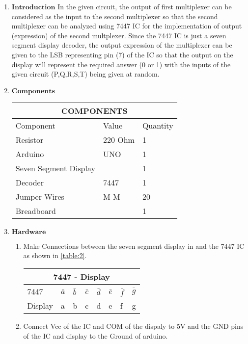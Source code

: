 \documentclass{article}
\begin{document}
\begin{enumerate}
	\item $\textbf{Introduction}$ \newline
		In the given circuit, the output of first multiplexer can be considered as the input to the second multiplexer so that the second multiplexer can be analyzed using 7447 IC for the implementation of output (expression) of the second multplexer. Since the 7447 IC is just a seven segment display decoder, the output expression of the multiplexer can be given to the LSB representing pin (7) of the IC so that the output on the display will represent the required answer (0 or 1) with the inputs of the given circuit (P,Q,R,S,T) being given at random.
	\item $\textbf{Components}$
		\label{table:1}\begin{tabular}{|p{5cm}|p{3cm}|p{2cm}|}
			\hline
			\multicolumn{3}{|c|}{COMPONENTS}\\
			\hline
			Component& Value& Quantity\\
			\hline
			Resistor &220 Ohm& 1\\
			\hline
			Arduino& UNO& 1\\
			\hline
			Seven Segment Display&  & 1\\
			\hline
			Decoder& 7447& 1\\
			\hline
			Jumper Wires& M-M& 20\\
			\hline
			Breadboard&  & 1\\
			\hline
		\end{tabular}
		\item $\textbf{Hardware}$
		\begin{enumerate}
			\item Make Connections between the seven segment display in and the 7447 IC as shown in \ref{table:2}.
				\label{table:2}\begin{tabular}{|p{3cm}|p{1cm}|p{1cm}|p{1cm}|p{1cm}|p{1cm}|p{1cm}|p{1cm}|}
					\hline
					\multicolumn{8}{|c|}{7447 - Display}\\
					\hline
					7447& $\bar{a}$ & $\bar{b}$ & $\bar{c}$ & $\bar{d}$ & $\bar{e}$ & $\bar{f}$ & $\bar{g}$ \\
					\hline
					Display& a& b& c& d& e& f& g\\
					\hline
				\end{tabular}
				\newline
			\item Connect Vcc of the IC and COM of the dispaly to 5V and the GND pins of the IC and display to the Ground of arduino.

\end{enumerate}
\end{enumerate}
\end{document}
